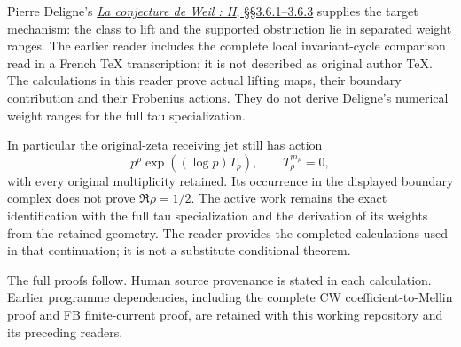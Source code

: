 Pierre Deligne's
\href{https://www.numdam.org/item/PMIHES_1980__52__137_0/}{\emph{La
conjecture de Weil : II}, §§3.6.1--3.6.3} supplies the target mechanism:
the class to lift and the supported obstruction lie in separated weight
ranges. The earlier reader includes the complete local invariant-cycle
comparison read in a French TeX transcription; it is not described as
original author TeX. The calculations in this reader prove actual
lifting maps, their boundary contribution and their Frobenius actions.
They do not derive Deligne's numerical weight ranges for the full tau
specialization.

In particular the original-zeta receiving jet still has action \[
p^\rho\exp((\log p)T_\rho),\qquad T_\rho^{m_\rho}=0,
\] with every original multiplicity retained. Its occurrence in the
displayed boundary complex does not prove \(\Re\rho=1/2\). The active
work remains the exact identification with the full tau specialization
and the derivation of its weights from the retained geometry. The reader
provides the completed calculations used in that continuation; it is not
a substitute conditional theorem.

The full proofs follow. Human source provenance is stated in each
calculation. Earlier programme dependencies, including the complete CW
coefficient-to-Mellin proof and FB finite-current proof, are retained
with this working repository and its preceding readers.

